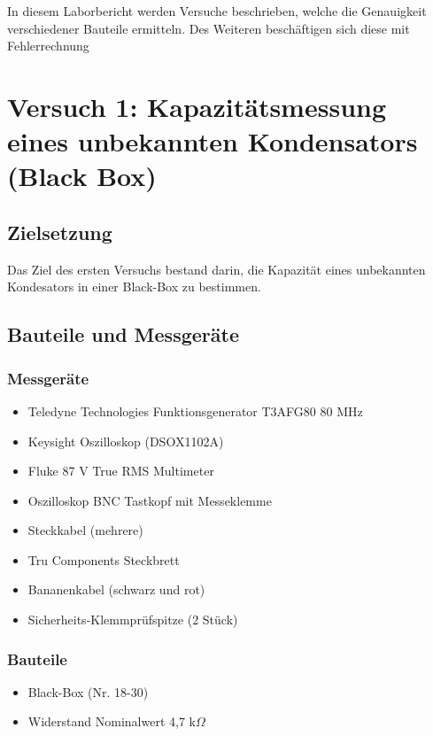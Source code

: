 \documentclass[a4paper,12pt]{article}
\begin{document}
\noindent In diesem Laborbericht werden Versuche beschrieben, welche die Genauigkeit verschiedener Bauteile ermitteln. Des Weiteren beschäftigen sich diese mit Fehlerrechnung



\newpage

\section{Versuch 1: Kapazitätsmessung eines unbekannten Kondensators (Black Box)}

\subsection{Zielsetzung}
Das Ziel des ersten Versuchs bestand darin, die Kapazität eines unbekannten Kondesators in einer Black-Box zu bestimmen. 

\subsection{Bauteile und Messgeräte}
\subsubsection*{Messgeräte}
\begin{itemize}
\item Teledyne Technologies Funktionsgenerator T3AFG80 80 MHz
\item Keysight Oszilloskop (DSOX1102A)
\item Fluke 87 V True RMS Multimeter
\item Oszilloskop BNC Tastkopf mit Messeklemme
\item Steckkabel (mehrere)
\item Tru Components Steckbrett
\item Bananenkabel (schwarz und rot)
\item Sicherheits-Klemmprüfspitze (2 Stück)
\end{itemize}

\subsubsection*{Bauteile}
\begin{itemize}
\item Black-Box (Nr. 18-30)
\item Widerstand Nominalwert 4,7 k$\Omega$
\end{itemize}
\newpage
\end{document}
